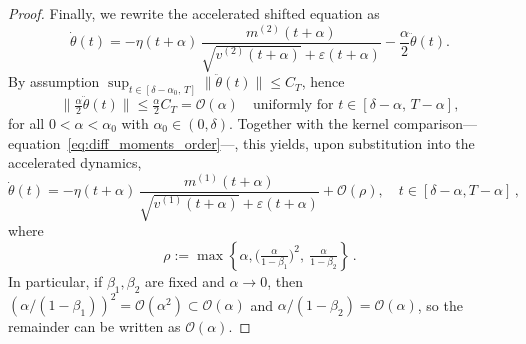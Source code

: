\documentclass[10pt,a4paper]{amsart}
\def\eqref#1{equation~\ref{#1}}
\begin{document}
\begin{proof}
Finally, we rewrite the accelerated shifted equation as
\[
\dot\theta(t)
=
-\eta(t+\alpha)\,
\frac{m^{(2)}(t+\alpha)}{\sqrt{v^{(2)}(t+\alpha)}+\varepsilon(t+\alpha)}
-\frac{\alpha}{2}\ddot\theta(t).
\]
By assumption $\sup_{t\in[\delta-\alpha_0,\,T]}\|\ddot\theta(t)\|\le C_T$, hence
\[
\Big\|\tfrac{\alpha}{2}\ddot\theta(t)\Big\|\le \tfrac{\alpha}{2}C_T=\mathcal O(\alpha)
\quad\text{uniformly for }t\in[\delta-\alpha,\,T-\alpha],
\]
for all $0<\alpha<\alpha_0$ with $\alpha_0\in(0,\delta)$. Together with the kernel comparison---\eqref{eq:diff_moments_order}---, this yields, upon substitution into the accelerated dynamics,
\[
\dot\theta(t)=
-\eta(t+\alpha)\,
\frac{m^{(1)}(t+\alpha)}{\sqrt{v^{(1)}(t+\alpha)}+\varepsilon(t+\alpha)}
+\mathcal O(\rho),
\quad t\in[\delta-\alpha,T-\alpha]\,,
\]
where
\[
\rho:=\max\left\{\alpha,\Big(\tfrac{\alpha}{1-\beta_1}\Big)^2,\ \tfrac{\alpha}{1-\beta_2}\right\}\,.
\]
In particular, if $\beta_1,\beta_2$ are fixed and $\alpha\to0$, then $\left(\alpha/(1-\beta_1)\right)^2 = \mathcal O(\alpha^2)\subset \mathcal{O}(\alpha)$ and $\alpha/(1-\beta_2) = \mathcal O(\alpha)$, so the remainder can be written as $\mathcal O(\alpha)$.
\end{proof}
\end{document}
